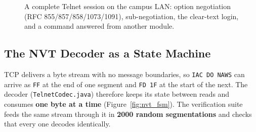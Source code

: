\documentclass[11pt,a4paper]{article}
\begin{document}
\begin{figure}[H]
{%
}
\caption{A complete Telnet session on the campus LAN: option negotiation (RFC 855/857/858/1073/1091), sub-negotiation, the clear-text login, and a command answered from another module.}
\label{fig:telnet_session}
\end{figure}

\subsection{The NVT Decoder as a State Machine}
TCP delivers a byte stream with no message boundaries, so \texttt{IAC DO NAWS} can arrive as \texttt{FF} at the end of one segment and \texttt{FD 1F} at the start of the next. The decoder (\texttt{TelnetCodec.java}) therefore keeps its state between reads and consumes \textbf{one byte at a time} (Figure~\ref{fig:nvt_fsm}). The verification suite feeds the same stream through it in \textbf{2000 random segmentations} and checks that every one decodes identically.
\end{document}
